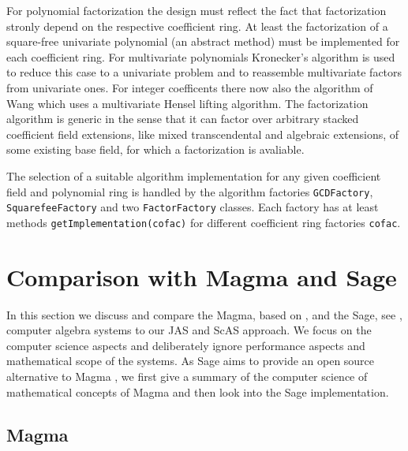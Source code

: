 \documentclass{llncs}
\newcommand{\code}[1]{\texttt{#1}}
\begin{document}
For polynomial factorization the design must reflect the fact that
factorization stronly depend on the respective coefficient ring.  At
least the factorization of a square-free univariate polynomial (an
abstract method) must be implemented for each coefficient ring.  For
multivariate polynomials Kronecker's algorithm is used to reduce this
case to a univariate problem and to reassemble multivariate factors
from univariate ones. For integer coefficents there now also the
algorithm of Wang which uses a multivariate Hensel lifting algorithm.
The factorization algorithm is generic in the sense that it can factor
over arbitrary stacked coefficient field extensions, like mixed
transcendental and algebraic extensions, of some existing base field,
for which a factorization is avaliable.

The selection of a suitable algorithm implementation for any given
coefficient field and polynomial ring is handled by the
algorithm factories \code{GCD\-Factory}, \code{Squarefee\-Factory} and
two \code{Factor\-Factory} classes. Each factory has at least methods
\code{get\-Implemen\-tation(cofac)} for different coefficient ring
factories \code{cofac}.


\section{Comparison with Magma and Sage} %
\label{sec:compare}

In this section we discuss and compare the Magma, based on
\cite{BosmaCannonMatthews:1994,BosmaCannonPlayoust:1997}, and the
Sage, see \cite{Stein:2005,SageWiki:2009}, computer algebra systems to
our JAS and ScAS approach. We focus on the computer science aspects
and deliberately ignore performance aspects and mathematical scope of
the systems.
%
As Sage aims to provide an open source alternative to Magma
\cite{SageWiki:2009}, we first give a summary of the computer science
of mathematical concepts of Magma and then look into the Sage
implementation.


\subsection{Magma} %
\end{document}

